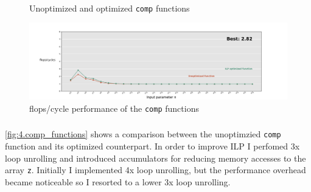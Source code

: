 \documentclass[tikz,14pt,fleqn]{article}
\begin{document}
\subsubsection{} %
\begin{figure}[h!]
    \begin{subfigure}{1\linewidth}
        \inputminted[fontsize=\scriptsize, bgcolor=CODEBG, firstline=62, lastline=68]{C}{../ex4/lu4.c}
    \end{subfigure}\\
    \begin{subfigure}{1\linewidth}
        \inputminted[fontsize=\scriptsize, bgcolor=CODEBG, firstline=62, lastline=82]{C}{../ex4/lu4_optimized.c}
    \end{subfigure}
    \caption{Unoptimized and optimized \texttt{comp} functions}
    \label{fig:4.comp_functions}
\end{figure}
\begin{figure}
    \vspace*{-0.7cm}
    \includegraphics[width=\linewidth]{../out/ex4.pdf}
    \caption{flops/cycle performance of the \texttt{comp} functions}
    \label{fig:4.comp_functions_plot}
\end{figure}
\subsubsection{} %
\subsubsection{} %

\subsubsection{} %
\autoref{fig:4.comp_functions} shows a comparison between the unoptimzied \texttt{comp} function and its optimized counterpart. In order to improve ILP I perfomed 3x loop unrolling and introduced accumulators for reducing memory accesses to the array \texttt{z}. Initially I implemented 4x loop unrolling, but the performance overhead became noticeable so I resorted to a lower 3x loop unrolling.
\end{document}
